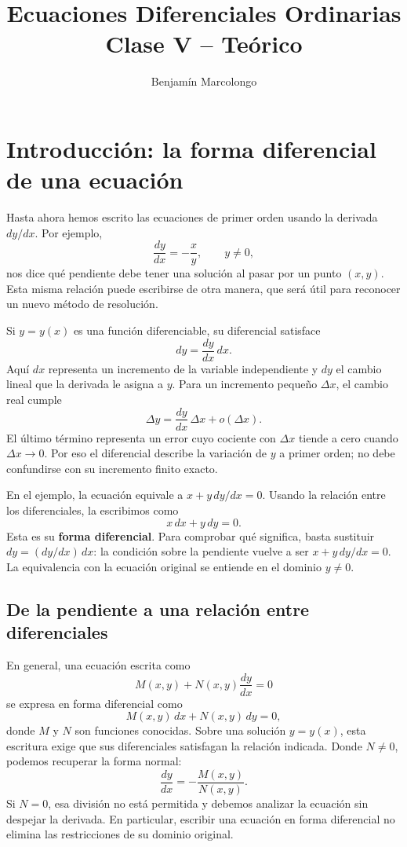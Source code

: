\documentclass[12pt,a4paper]{article}
\title{Ecuaciones Diferenciales Ordinarias\\Clase V -- Teórico}
\author{Benjamín Marcolongo}
\date{}
\begin{document}
	\maketitle

	\section*{Introducción: la forma diferencial de una ecuación}

	Hasta ahora hemos escrito las ecuaciones de primer orden usando la derivada \(dy/dx\). Por ejemplo,
	\[
	\frac{dy}{dx}=-\frac{x}{y},\qquad y\neq0,
	\]
	nos dice qué pendiente debe tener una solución al pasar por un punto \((x,y)\). Esta misma relación puede escribirse de otra manera, que será útil para reconocer un nuevo método de resolución.

	Si \(y=y(x)\) es una función diferenciable, su diferencial satisface
	\[
	 dy=\frac{dy}{dx}\,dx.
	\]
	Aquí \(dx\) representa un incremento de la variable independiente y \(dy\) el cambio lineal que la derivada le asigna a \(y\). Para un incremento pequeño \(\Delta x\), el cambio real cumple
	\[
	\Delta y=\frac{dy}{dx}\,\Delta x+o(\Delta x).
	\]
	El último término representa un error cuyo cociente con \(\Delta x\) tiende a cero cuando \(\Delta x\to0\). Por eso el diferencial describe la variación de \(y\) a primer orden; no debe confundirse con su incremento finito exacto.

	En el ejemplo, la ecuación equivale a \(x+y\,dy/dx=0\). Usando la relación entre los diferenciales, la escribimos como
	\[
	\boxed{x\,dx+y\,dy=0.}
	\]
	Esta es su \textbf{forma diferencial}. Para comprobar qué significa, basta sustituir \(dy=(dy/dx)\,dx\): la condición sobre la pendiente vuelve a ser \(x+y\,dy/dx=0\). La equivalencia con la ecuación original se entiende en el dominio \(y\neq0\).

	\clearpage
	\subsection*{De la pendiente a una relación entre diferenciales}

	En general, una ecuación escrita como
	\[
	M(x,y)+N(x,y)\frac{dy}{dx}=0
	\]
	se expresa en forma diferencial como
	\[
	\boxed{M(x,y)\,dx+N(x,y)\,dy=0,}
	\]
	donde \(M\) y \(N\) son funciones conocidas. Sobre una solución \(y=y(x)\), esta escritura exige que sus diferenciales satisfagan la relación indicada. Donde \(N\neq0\), podemos recuperar la forma normal:
	\[
	\frac{dy}{dx}=-\frac{M(x,y)}{N(x,y)}.
	\]
	Si \(N=0\), esa división no está permitida y debemos analizar la ecuación sin despejar la derivada. En particular, escribir una ecuación en forma diferencial no elimina las restricciones de su dominio original.
\end{document}
